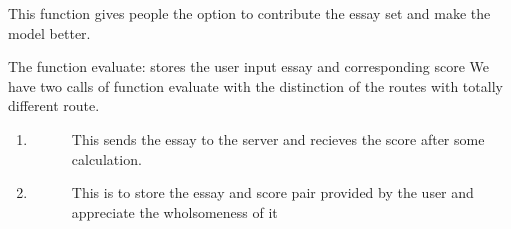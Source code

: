 \documentclass[letterpaper,10pt,english]{sphinxmanual}
\begin{document}
\begin{fulllineitems}
\label{\detokenize{main:main.contrbPage}}
This function gives people the option to contribute the essay set and make the model better.

\begin{sphinxVerbatim}[commandchars=\\\{\}]
                   
\end{sphinxVerbatim}

\begin{sphinxVerbatim}[commandchars=\\\{\}]
 
\end{sphinxVerbatim}

\end{fulllineitems}


\begin{fulllineitems}
\label{\detokenize{main:main.evaluate}}
The function evaluate: stores the user input essay and corresponding score
We have two calls of function evaluate with the distinction of the routes with totally different route.
\begin{enumerate}
%
\item {} \begin{description}
\item[{}] \leavevmode
This sends the essay to the server and recieves the score after some calculation.

\end{description}

\item {} \begin{description}
\item[{}] \leavevmode
This is to store the essay and score pair provided by the user and appreciate the wholsomeness of it

\end{description}

\end{enumerate}

\end{fulllineitems}
\end{document}
